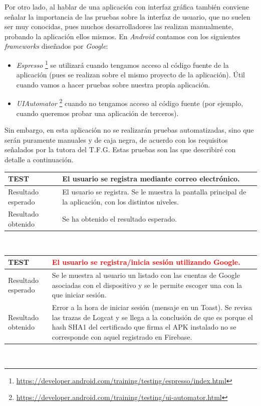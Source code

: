 \documentclass[twoside]{report}
\newcommand\addrow[2]{#1 &#2\\ }
\newcommand\addheading[2]{#1 &#2\\ \hline}
\newcommand\tabularhead{\begin{tabular}{lp{0.7\textwidth}}
\hline
}
\newenvironment{test}{\tabularhead}
{\hline\end{tabular}}
\begin{document}
Por otro lado, al hablar de una aplicación con interfaz gráfica también conviene señalar la importancia de las pruebas sobre la interfaz de usuario, que no suelen ser muy conocidas, pues muchos desarrolladores las realizan manualmente, probando la aplicación ellos mismos. En \textit{Android} contamos con los siguientes \textit{frameworks} diseñados por \textit{Google}:

\begin{itemize}
\item \textit{Espresso} \footnote{\url{https://developer.android.com/training/testing/espresso/index.html}} se utilizará cuando tengamos acceso al código fuente de la aplicación (pues se realizan sobre el mismo proyecto de la aplicación). Útil cuando vamos a hacer pruebas sobre nuestra propia aplicación.

\item \textit{UIAutomator} \footnote{\url{https://developer.android.com/training/testing/ui-automator.html}} cuando no tengamos acceso al código fuente (por ejemplo, cuando queremos probar una aplicación de terceros).

\end{itemize}


Sin embargo, en esta aplicación no se realizarán pruebas automatizadas, sino que serán puramente manuales y de caja negra, de acuerdo con los requisitos señalados por la tutora del T.F.G. Estas pruebas son las que describiré con detalle a continuación.

\vspace{1cm}

\begin{test}
  \addheading{\textbf{TEST\arabic{test}}}{El usuario se registra mediante correo electrónico.} 
  \addrow{Resultado esperado}{El usuario se registra. Se le muestra la pantalla principal de la aplicación, con los distintos niveles.}
  \addrow{Resultado obtenido}{Se ha obtenido el resultado esperado.}
\end{test}\\

\vspace{0.5cm}

\begin{test}
  \addheading{\textbf{TEST\arabic{test}}}{\textcolor{red}{El usuario se registra/inicia sesión utilizando Google.}} 
  \addrow{Resultado esperado}{Se le muestra al usuario un listado con las cuentas de Google asociadas con el dispositivo y se le permite escoger una con la que iniciar sesión.}
  \addrow{Resultado obtenido}{Error a la hora de iniciar sesión (mensaje en un Toast). Se revisa las trazas de Logcat y se llega a la conclusión de que es porque el hash SHA1 del certificado que firma el APK instalado no se corresponde con aquel registrado en Firebase.}
\end{test}\\
\end{document}
